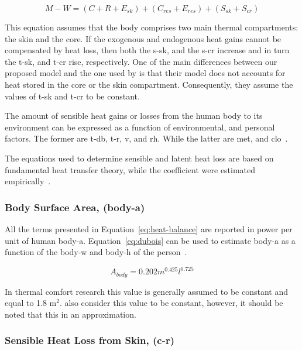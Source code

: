 \begin{equation}
    M - W = (C + R + E_{sk}) + (C_{res} + E_{res}) + (S_{sk} + S_{cr})\label{eq:heat-balance}
\end{equation}

This equation assumes that the body comprises two main thermal compartments: the skin and the core.
If the exogenous and endogenous heat gains cannot be compensated by heat loss, then both the \ac{s-sk}, and the \ac{s-cr} increase and in turn the \ac{t-sk}, and \ac{t-cr} rise, respectively.
One of the main differences between our proposed model and the one used by  is that their model does not accounts for heat stored in the core or the skin compartment.
Consequently, they assume the values of \ac{t-sk} and \ac{t-cr} to be constant.

The amount of sensible heat gains or losses from the human body to its environment can be expressed as a function of environmental, and personal factors.
The former are \ac{t-db}, \ac{t-r}, \ac{v}, and \ac{rh}.
While the latter are \ac{met}, and \ac{clo}~\cite{ASHRA2017}.

The equations used to determine sensible and latent heat loss are based on fundamental heat transfer theory, while the coefficient were estimated empirically~\cite{ASHRA2017}.

\subsubsection{Body Surface Area, (\acs{body-a})}

All the terms presented in Equation~\ref{eq:heat-balance} are reported in power per unit of human \ac{body-a}.
Equation~\ref{eq:dubois} can be used to estimate \ac{body-a} as a function of the \ac{body-w} and \ac{body-h} of the person~\cite{DuBois}.

\begin{equation}
    A_{body} = 0.202 m^{0.425} l^{0.725}\label{eq:dubois}
\end{equation}

In thermal comfort research this value is generally assumed to be constant and equal to 1.8 m$^{2}$.
 also consider this value to be constant, however, it should be noted that this in an approximation.

\subsubsection{Sensible Heat Loss from Skin, (\acs{c-r})}

